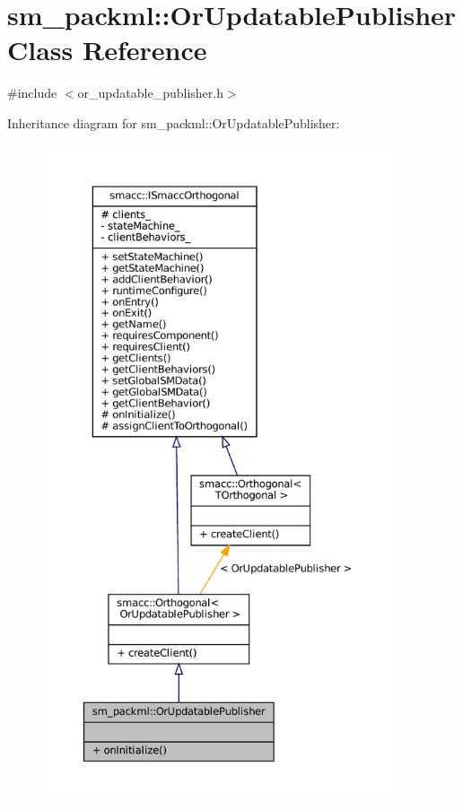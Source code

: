 \hypertarget{classsm__packml_1_1OrUpdatablePublisher}{}\section{sm\+\_\+packml\+:\+:Or\+Updatable\+Publisher Class Reference}
\label{classsm__packml_1_1OrUpdatablePublisher}


{\ttfamily \#include $<$or\+\_\+updatable\+\_\+publisher.\+h$>$}



Inheritance diagram for sm\+\_\+packml\+:\+:Or\+Updatable\+Publisher\+:
\nopagebreak
\begin{figure}[H]
\begin{center}
\leavevmode
\includegraphics[height=550pt]{classsm__packml_1_1OrUpdatablePublisher__inherit__graph}
\end{center}
\end{figure}


